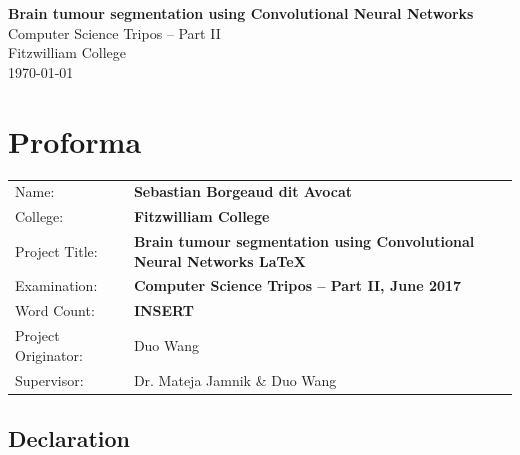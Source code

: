 \documentclass[12pt,a4paper,twoside,openright]{report}
\begin{document}





\pagestyle{empty}


\vspace*{60mm}
\begin{center}
\Huge
\textbf{Brain tumour segmentation using Convolutional Neural Networks} \\[5mm]
Computer Science Tripos -- Part II \\[5mm]
Fitzwilliam College \\[5mm]
\today  %
\end{center}


\pagestyle{plain}

\chapter*{Proforma}

{\large
\begin{tabular}{ll}
Name:               & \bf Sebastian Borgeaud dit Avocat                       \\
College:            & \bf Fitzwilliam College                     \\
Project Title:      & \bf Brain tumour segmentation using Convolutional Neural Networks \LaTeX \\
Examination:        & \bf Computer Science Tripos -- Part II, June 2017  \\
Word Count:         & \bf INSERT  \\
Project Originator: & Duo Wang                    \\
Supervisor:         & Dr. Mateja Jamnik \& Duo Wang                    \\ 
\end{tabular}
}

\newpage
\section*{Declaration}
\end{document}
